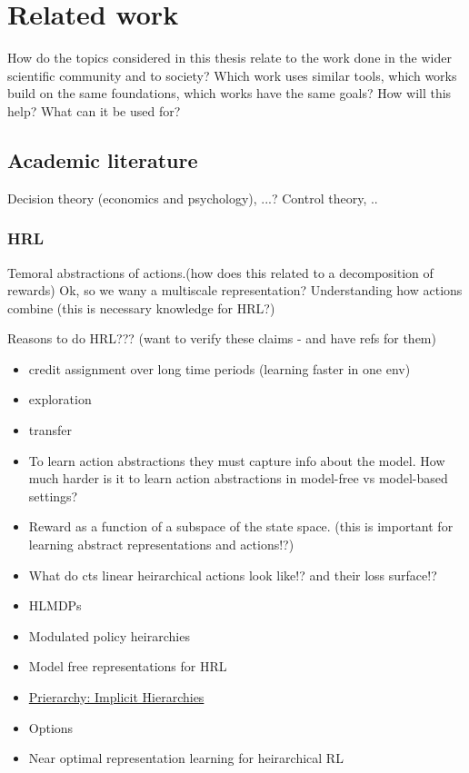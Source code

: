\chapter{Related work}

How do the topics considered in this thesis relate to the work done in the wider scientific community and to society? Which work uses similar tools, which works build on the same foundations, which works have the same goals? How will this help? What can it be used for?

\hypertarget{related-work}{%
\section{Academic literature}\label{related-work}}

Decision theory (economics and psychology), ...?
Control theory, ..

\hypertarget{hrl}{%
\subsection{HRL}\label{hrl}}

Temoral abstractions of actions.(how does this related to a
decomposition of rewards) Ok, so we wany a multiscale representation?
Understanding how actions combine (this is necessary knowledge for HRL?)

Reasons to do HRL??? (want to verify these claims - and have refs for
them)

\begin{itemize}
\item
  credit assignment over long time periods (learning faster in one env)
\item
  exploration
\item
  transfer
\item
  To learn action abstractions they must capture info about the model.
  How much harder is it to learn action abstractions in model-free vs
  model-based settings?
\item
  Reward as a function of a subspace of the state space. (this is
  important for learning abstract representations and actions!?)
\item
  What do cts linear heirarchical actions look like!? and their loss
  surface!?
\item
  HLMDPs \cite{Saxea}
\item
  Modulated policy heirarchies \cite{Pashevich}
\item
  Model free representations for HRL \cite{Rafati}
\item
  \href{https://blog.aqnichol.com/2019/04/03/prierarchy-implicit-hierarchies/}{Prierarchy:
  Implicit Hierarchies}
\item
  Options
\item
  Near optimal representation learning for heirarchical RL \cite{Nachum2018}
\end{itemize}

